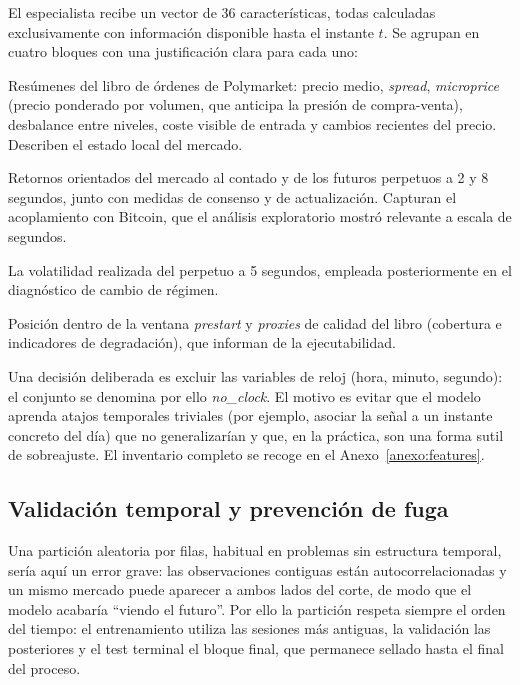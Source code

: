 El especialista recibe un vector de 36 características, todas calculadas exclusivamente con
información disponible hasta el instante $t$. Se agrupan en cuatro bloques con una
justificación clara para cada uno:

\begin{description}[noitemsep, leftmargin=2.8cm, font=\bfseries]
\item[Estado del libro] Resúmenes del libro de órdenes de Polymarket: precio medio,
\emph{spread}, \emph{microprice} (precio ponderado por volumen, que anticipa la presión de
compra-venta), desbalance entre niveles, coste visible de entrada y cambios recientes del
precio. Describen el estado local del mercado.
\item[Referencias externas] Retornos orientados del mercado al contado y de los futuros
perpetuos a 2 y 8 segundos, junto con medidas de consenso y de actualización. Capturan el
acoplamiento con Bitcoin, que el análisis exploratorio mostró relevante a escala de segundos.
\item[Volatilidad] La volatilidad realizada del perpetuo a 5 segundos, empleada posteriormente
en el diagnóstico de cambio de régimen.
\item[Contexto de ventana] Posición dentro de la ventana \emph{prestart} y \emph{proxies} de
calidad del libro (cobertura e indicadores de degradación), que informan de la ejecutabilidad.
\end{description}

Una decisión deliberada es excluir las variables de reloj (hora, minuto, segundo): el
conjunto se denomina por ello \emph{no\_clock}. El motivo es evitar que el modelo aprenda
atajos temporales triviales (por ejemplo, asociar la señal a un instante concreto del día)
que no generalizarían y que, en la práctica, son una forma sutil de sobreajuste. El inventario
completo se recoge en el Anexo~\ref{anexo:features}.

\subsection{Validación temporal y prevención de fuga}
\label{sec::validacion}

Una partición aleatoria por filas, habitual en problemas sin estructura temporal, sería aquí
un error grave: las observaciones contiguas están autocorrelacionadas y un mismo mercado
puede aparecer a ambos lados del corte, de modo que el modelo acabaría ``viendo el futuro''.
Por ello la partición respeta siempre el orden del tiempo: el entrenamiento utiliza las
sesiones más antiguas, la validación las posteriores y el test terminal el bloque final, que
permanece sellado hasta el final del proceso.


